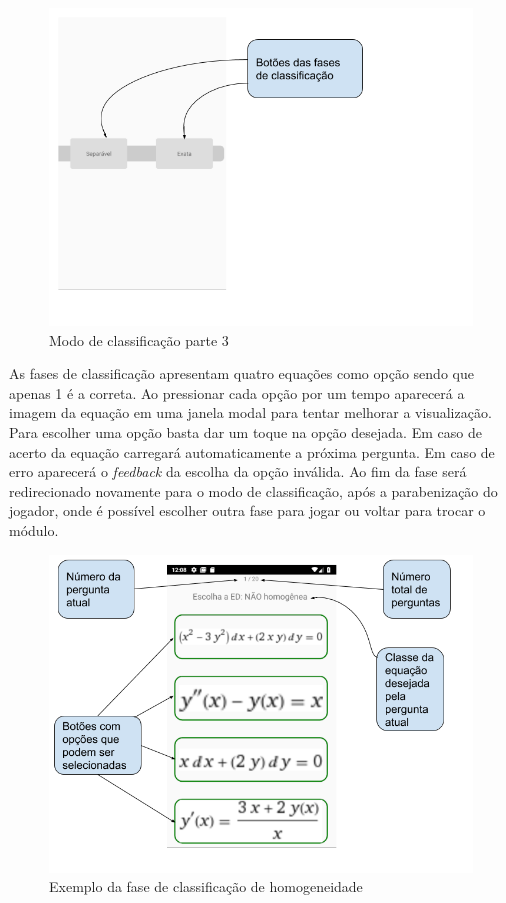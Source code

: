 \begin{figure}[H]
\centering
\caption{Modo de classificação parte 3}
\includegraphics[scale=0.72]{figuras/modo_classificacao_3.png}
\end{figure}

As fases de classificação apresentam quatro equações como opção sendo que apenas 1 é a correta.
Ao pressionar cada opção por um tempo aparecerá a imagem da equação em uma janela modal para tentar melhorar a visualização.
Para escolher uma opção basta dar um toque na opção desejada.
Em caso de acerto da equação carregará automaticamente a próxima pergunta.
Em caso de erro aparecerá o \textit{feedback} da escolha da opção inválida.
Ao fim da fase será redirecionado novamente para o modo de classificação, após a parabenização do jogador, onde é possível escolher outra fase para jogar ou voltar para trocar o módulo.

\begin{figure}[H]
\centering
\caption{Exemplo da fase de classificação de homogeneidade}
\includegraphics[scale=0.72]{figuras/ex_ed_n_homog.png}
\end{figure}

